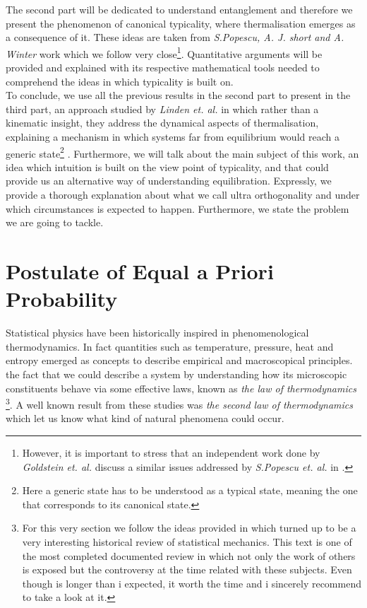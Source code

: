 \indent The second part will be dedicated to understand entanglement and therefore we present the phenomenon of canonical typicality, where thermalisation emerges as a consequence of it. These ideas are taken from  \textit{S.Popescu, A. J. short and A. Winter} \cite{popescu_entanglement_2006, popescu_foundations_2005} work which we follow very close\footnote{However, it is important to stress that an independent work done by \textit{Goldstein et. al.} \cite{goldstein_canonical_2006} discuss a similar issues addressed by  \textit{S.Popescu et. al.} in \cite{popescu_entanglement_2006, popescu_foundations_2005}.}. Quantitative arguments will be provided and explained with its respective mathematical tools needed to comprehend the ideas in which typicality is built on.\\

\indent To conclude, we use all the previous results in the second part to present in the third part, an approach studied by \textit{Linden et. al.} \cite{linden_quantum_2009} in which rather than a kinematic insight, they address the dynamical aspects of thermalisation, explaining a mechanism in which systems far from equilibrium would reach a generic state\footnote{Here a generic state has to be understood as a typical state, meaning the one that corresponds to its canonical state.} \cite{linden_quantum_2009}. Furthermore, we will talk about the main subject of this work, an idea which intuition is built on the view point of typicality, and that could provide us an alternative way of understanding equilibration. Expressly, we provide a thorough explanation about what we call ultra orthogonality and under which circumstances is expected to happen. Furthermore, we state the problem we are going to tackle. 

\section{Postulate of Equal a Priori Probability}
Statistical physics have been historically inspired in phenomenological thermodynamics. In fact quantities such as temperature, pressure, heat and entropy emerged as concepts to describe empirical and macroscopical principles. the fact that we could describe a system by understanding how its microscopic constituents behave via some effective laws, known as \textit{the law of thermodynamics} \cite{uffink_handbook_2007}\footnote{For this very section we follow the ideas provided in \cite{uffink_handbook_2007} which turned up to be a very interesting historical review of statistical mechanics. This text is one of the most completed documented review in which not only the work of others is exposed but the controversy at the time related with these subjects. Even though is longer than i expected, it worth the time and i sincerely recommend to take a look at it.}. A well known result from these studies was \textit{the second law of thermodynamics} which let us know what kind of natural phenomena could occur.\\


